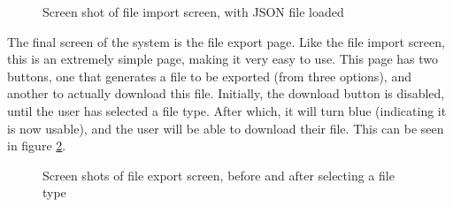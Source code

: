 \begin{figure}[ht!]
	\begin{center}
	\end{center}
	\vspace{-6mm}
	\caption{Screen shot of file import screen, with JSON file loaded}
	\label{fig:ss-ui-7}
	\vspace{-3mm}	
\end{figure}

\noindent
The final screen of the system is the file export page. Like the file import screen, this is an extremely simple page, making it very easy to use. This page has two buttons, one that generates a file to be exported (from three options), and another to actually download this file. Initially, the download button is disabled, until the user has selected a file type. After which, it will turn blue (indicating it is now usable), and the user will be able to download their file. This can be seen in figure \ref{fig:ss-ui-8}.

\begin{figure}[ht!]
	\vspace{-1mm}
	\begin{center}
	\end{center}
	\vspace{-6mm}
	\caption{Screen shots of file export screen, before and after selecting a file type}
	\label{fig:ss-ui-8}
\end{figure}




